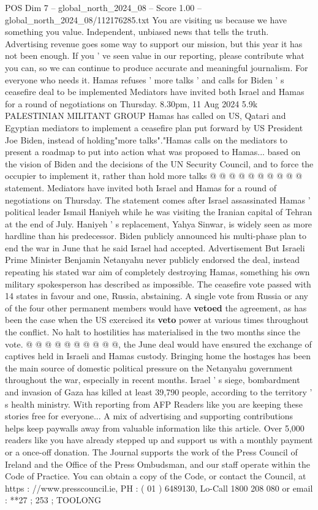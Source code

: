 \begin{textsample}{POS Dim 7 – global\_north\_2024\_08 – Score 1.00 – global\_north\_2024\_08/112176285.txt}  \label{ex:f7_pos_364}
You are visiting us because we have something you value.
Independent, unbiased news that tells the truth.
Advertising revenue goes some way to support our mission, but this year it has not been enough.
If you ' ve seen value in our reporting, please contribute what you can, so we can continue to produce accurate and meaningful journalism.
For everyone who needs it.
Hamas refuses ' more talks ' and calls for Biden ' s ceasefire deal to be implemented Mediators have invited both Israel and Hamas for a round of negotiations on Thursday. 8.30pm, 11 Aug 2024 5.9k PALESTINIAN MILITANT GROUP Hamas has called on US, Qatari and Egyptian mediators to implement a ceasefire plan put forward by US President Joe Biden, instead of holding"more talks"."Hamas calls on the mediators to present a roadmap to put into action what was proposed to Hamas... based on the vision of Biden and the decisions of the UN Security Council, and to force the occupier to implement it, rather than hold more talks @ @ @ @ @ @ @ @ @ @ statement.
Mediators have invited both Israel and Hamas for a round of negotiations on Thursday.
The statement comes after Israel assassinated Hamas ' political leader Ismail Haniyeh while he was visiting the Iranian capital of Tehran at the end of July.
Haniyeh ' s replacement, Yahya Sinwar, is widely seen as more hardline than his predecessor.
Biden publicly announced his multi-phase plan to end the war in June that he said Israel had accepted.
Advertisement But Israeli Prime Minister Benjamin Netanyahu never publicly endorsed the deal, instead repeating his stated war aim of completely destroying Hamas, something his own military spokesperson has described as impossible.
The ceasefire vote passed with 14 states in favour and one, Russia, abstaining.
A single vote from Russia or any of the four other permanent members would have \textbf{vetoed} the agreement, as has been the case when the US exercised its \textbf{veto} power at various times throughout the conflict.
No halt to hostilities has materialised in the two months since the vote. @ @ @ @ @ @ @ @ @ @, the June deal would have ensured the exchange of captives held in Israeli and Hamas custody.
Bringing home the hostages has been the main source of domestic political pressure on the Netanyahu government throughout the war, especially in recent months.
Israel ' s siege, bombardment and invasion of Gaza has killed at least 39,790 people, according to the territory ' s health ministry.
With reporting from AFP Readers like you are keeping these stories free for everyone...
A mix of advertising and supporting contributions helps keep paywalls away from valuable information like this article.
Over 5,000 readers like you have already stepped up and support us with a monthly payment or a once-off donation.
The Journal supports the work of the Press Council of Ireland and the Office of the Press Ombudsman, and our staff operate within the Code of Practice.
You can obtain a copy of the Code, or contact the Council, at https : //www.presscouncil.ie, PH : ( 01 ) 6489130, Lo-Call 1800 208 080 or email : **27 ; 253 ; TOOLONG

\end{textsample}
